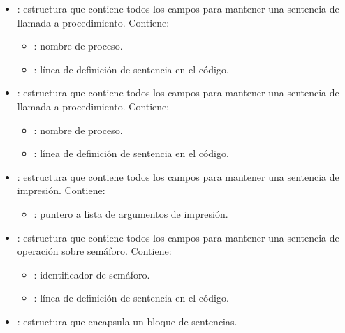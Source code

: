 \begin{itemize}
\begin{itemize}
        \item {} : estructura que contiene todos los campos para mantener una sentencia de llamada a procedimiento. Contiene:
        \begin{itemize}
            \item {}: nombre de proceso.
            \item {} : línea de definición de sentencia en el código.
        \end{itemize}
    \end{itemize}
    \begin{itemize}
        \item {} : estructura que contiene todos los campos para mantener una sentencia de llamada a procedimiento. Contiene:
        \begin{itemize}
            \item {}: nombre de proceso.
            \item {} : línea de definición de sentencia en el código.
        \end{itemize}
    \end{itemize}
    \begin{itemize}
        \item {} : estructura que contiene todos los campos para mantener una sentencia de impresión. Contiene:
        \begin{itemize}
            \item {}: puntero a lista de argumentos de impresión.
        \end{itemize}
    \end{itemize}
    \begin{itemize}
        \item {} : estructura que contiene todos los campos para mantener una sentencia de operación sobre semáforo. Contiene:
        \begin{itemize}
            \item {}: identificador de semáforo.
            \item {}: línea de definición de sentencia en el código.
        \end{itemize}
    \end{itemize}
    \begin{itemize}
        \item {} : estructura que encapsula un bloque de sentencias.
    \end{itemize}
\end{itemize}

